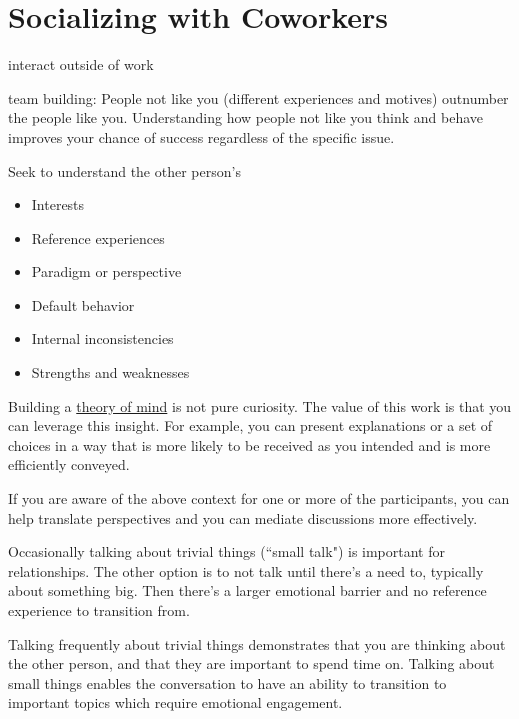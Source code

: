 \section{Socializing with Coworkers\label{sec:socializing}}

interact outside of work

team building:
People not like you (different experiences and motives) outnumber the people like you.
Understanding how people not like you think and behave improves your chance of success regardless of the specific issue.

Seek to understand the other person's
\begin{itemize}
\item Interests
\item Reference experiences
\item Paradigm or perspective
\item Default behavior
\item Internal inconsistencies
\item Strengths and weaknesses
\end{itemize}

Building a \href{https://en.wikipedia.org/wiki/Theory_of_mind}{theory of mind}
is not pure curiosity. The value of this work is that you can leverage this insight. For example, you can present explanations or a set of choices in a way that is more likely to be received as you intended and is more efficiently conveyed.  

If you are aware of the above context for one or more of the participants, you can help translate perspectives and you can mediate discussions more effectively. 

Occasionally talking about trivial things (``small talk") is important for relationships.
The other option is to not talk until there's a need to, typically about something big. Then there's a larger emotional barrier and no reference experience to transition from.

Talking frequently about trivial things demonstrates that you are thinking about the other person, and that they are important to spend time on.
Talking about small things enables the conversation to have an ability to transition to important topics which require emotional engagement.

